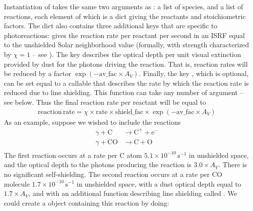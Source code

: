 \documentclass[letterpaper,10pt,english]{sphinxmanual}
\begin{document}
Instantiation of  takes the same two arguments as
{\hyperref[chemistry:ssssec\string-reaction\string-matrix]{}}: a list of species, and a list of
reactions, each element of which is a dict giving the reactants and
stoichiometric factors. The dict also contains three additional keys
that are specific to photoreactions:  gives the reaction rate
per reactant per second in an ISRF equal to the unshielded Solar
neighborhood value (formally, with strength characterized by
\(\chi = 1\) -- see {\hyperref[cloudfiles:tab\string-cloudfiles]{}}). The key 
describes the optical depth per unit visual extinction provided by
dust for the photons driving the reaction. That is, reaction rates
will be reduced by a factor \(\exp(-\mathrm{av\_fac}\times
A_V)\). Finally, the key , which is optional, can be set
equal to a callable that describes the rate by which the reaction rate
is reduced due to line shielding. This function can take any number of
argument -- see below. Thus the final reaction rate per reactant will
be equal to
\begin{equation*}
\begin{split}\mathrm{reaction\, rate} = \chi \times \mathrm{rate} \times
\mathrm{shield\_fac} \times \exp(-\mathrm{av\_fac}\times A_V)\end{split}
\end{equation*}
As an example, suppose we wished to include the reactions
\begin{equation*}
\begin{split}\gamma + \mathrm{C} & \rightarrow \mathrm{C}^+ + \mathrm{e}^- \\
\gamma + \mathrm{CO} & \rightarrow \mathrm{C} + \mathrm{O} \\\end{split}
\end{equation*}
The first reaction occurs at a rate per C atom \(5.1\times
10^{-10}\,\mathrm{s}^{-1}\) in unshielded space, and the optical depth
to the photons producing the reaction is \(3.0\times A_V\). There
is no significant self-shielding. The second reaction occurs at a rate
per CO molecule \(1.7\times 10^{-10}\,\mathrm{s}^{-1}\) in
unshielded space, with a dust optical depth equal to \(1.7\times
A_V\), and with an additional function describing line shielding called
. We could create a  object containing
this reaction by doing:
\end{document}

